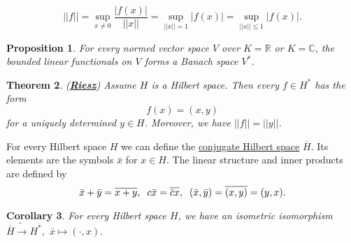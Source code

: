 \documentclass{article}
\newtheorem{theorem}{Theorem}[section]
\newtheorem{corollary}[theorem]{Corollary}
\newtheorem{proposition}[theorem]{Proposition}
\theoremstyle{definition}
\newcommand{\R}{\mathbb{R}}
\newcommand{\C}{\mathbb{C}}
\newcommand{\tmm}{\hspace{2mm}}
\begin{document}
$$||f|| = \sup_{x\neq 0}\frac{|f(x)|}{||x||}= \sup_{||x||=1}|f(x)| = \sup_{||x||\leq 1}|f(x)|.$$
\begin{proposition}
    For every normed vector space $V$ over $K=\R$ or $K=\C$, the bounded linear functionals on $V$ forms a Banach space $V^*$.
\end{proposition}
\begin{theorem}(\underline{\textbf{Riesz}})
    Assume $H$ is a Hilbert space. Then every $f\in H^*$ has the form $$f(x) = (x,y)$$
    for a uniquely determined $y\in H$. Moreover, we have $||f|| = ||y||$.
    
\end{theorem}
For every Hilbert space $H$ we can define the \underline{conjugate Hilbert space} $\overline{H}$. Its elements are the symbols $\bar x$ for $x\in H$.
The linear structure and inner products are defined by $$\bar x + \bar y = \overline{x+y},\tmm c\bar x = \overline{\bar c x},\tmm (\bar x,\bar y) = \overline{(x,y)}=(y,x).$$
\begin{corollary}
    For every Hilbert space $H$, we have an isometric isomorphism $\overline{H}\tilde\rightarrow H^*,$ $\bar x \mapsto (\cdot,x).$
\end{corollary}
\end{document}
